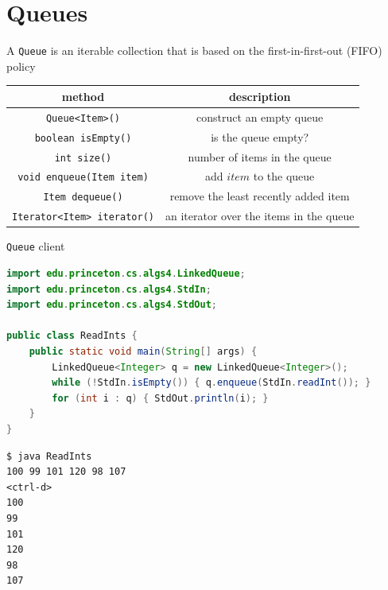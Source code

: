 \documentclass[8pt,a4paper,compress]{beamer}
\begin{document}
\section{Queues}
\begin{frame}[fragile]
\pause

A \lstinline{Queue} is an iterable collection that is based on the first-in-first-out (FIFO) policy
\begin{center}
\begin{tabular}{cc}
method & description \\ \hline
\lstinline$Queue<Item>()$ & construct an empty queue \\
\lstinline$boolean isEmpty()$ & is the queue empty? \\
\lstinline$int size()$ & number of items in the queue \\
\lstinline$void enqueue(Item item)$ & add $item$ to the queue \\
\lstinline$Item dequeue()$ & remove the least recently added item \\
\lstinline$Iterator<Item> iterator()$ & an iterator over the items in the queue
\end{tabular} 
\end{center}

\pause

\lstinline{Queue} client
\begin{lstlisting}[language=Java]
import edu.princeton.cs.algs4.LinkedQueue;
import edu.princeton.cs.algs4.StdIn;
import edu.princeton.cs.algs4.StdOut;

public class ReadInts {
    public static void main(String[] args) {
        LinkedQueue<Integer> q = new LinkedQueue<Integer>();
        while (!StdIn.isEmpty()) { q.enqueue(StdIn.readInt()); }
        for (int i : q) { StdOut.println(i); }
    }
}
\end{lstlisting}

\pause

\begin{lstlisting}[language={}]
$ java ReadInts
100 99 101 120 98 107
<ctrl-d>
100
99
101
120
98
107
\end{lstlisting}
\end{frame}
\end{document}
